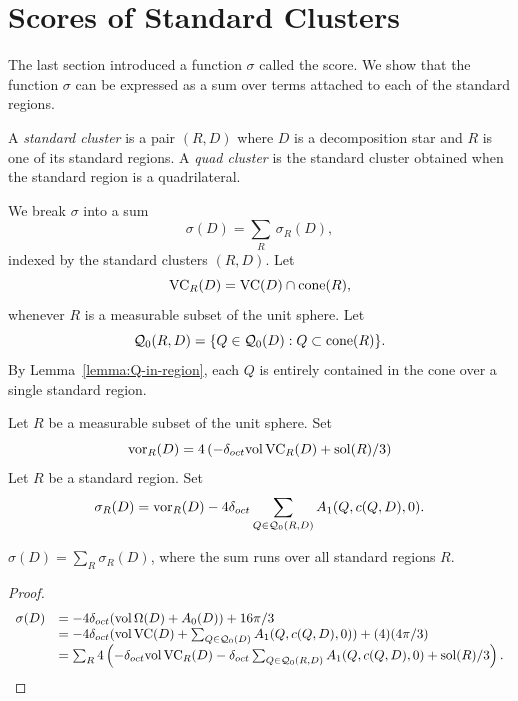 \section{Scores of Standard Clusters}
\label{sec:ssc}

The last section introduced a function $\sigma$ called the score. We
show that the function $\sigma$ can be expressed as a sum over terms
attached to each of the standard regions.

\begin{definition} \label{def:standard-cluster}
A {\it standard cluster\/} is a pair $(R,D)$ where $D$ is a
decomposition star and $R$ is one of its standard regions.  A {\it
quad cluster\/} is the standard cluster obtained when the standard
region is a quadrilateral.
\end{definition}
%


We break $\sigma$ into a sum
   \begin{equation}
   \sigma(D) = \sum_R\,\sigma_R(D),
   \end{equation}
indexed by the standard clusters $(R,D)$.  Let
   $$
   {\operatorname{VC}}_R(D) = {\operatorname{VC}}(D)\cap {\operatorname{cone}}(R),
   $$
whenever $R$ is a measurable subset of the unit sphere.  Let
   $$
   {\mathcal Q}_0(R,D) = \{Q\in {\mathcal Q}_0(D) : Q\subset {\operatorname{cone}}(R)\}.
   $$
By Lemma~\ref{lemma:Q-in-region},
 each $Q$ is entirely contained in the cone over a single
standard region.

\begin{definition} \label{def:score-std-region}
   Let $R$ be a measurable subset of the unit sphere.  Set
      $$
      \operatorname{vor}_R(D) =4\left(-\delta_{oct} {\operatorname{vol}}\,{\operatorname{VC}}_R(D)  + \operatorname{sol}(R)/3\right)
      $$
      Let $R$ be a standard region. Set
      $$
      \sigma_R(D) = \operatorname{vor}_R(D) - 4\delta_{oct}
         \sum_{Q\in{\mathcal Q}_0(R,D)} A_1(Q,c(Q,D),0).
      $$
 
\end{definition}

\begin{lemma} $\sigma(D) = \sum_R\sigma_R(D)$, where the sum runs
over all standard regions $R$.
\end{lemma}

\begin{proof}
   $$
   \begin{array}{lll}
      \sigma(D)
      &= -4\delta_{oct} ({\operatorname{vol}}\,\Omega(D) + A_0(D))+16\pi/3\\
      &= -4\delta_{oct} ({\operatorname{vol}}\,{\operatorname{VC}}(D)+\sum_{Q\in{\mathcal Q}_0(D)}
         A_1(Q,c(Q,D),0)) + (4) (4\pi/3)\\
      &= \sum_R 4\left (-\delta_{oct} {\operatorname{vol}}\,{\operatorname{VC}}_R(D) -\delta_{oct}
         \sum_{Q\in{\mathcal Q}_0(R,D)} A_1(Q,c(Q,D),0) +
         \operatorname{sol}(R)/3\right).
   \end{array}
   $$
\end{proof}

